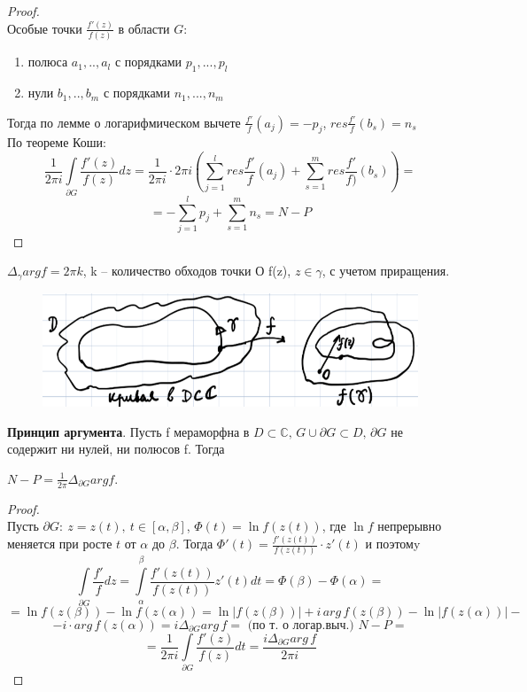 \begin{proof}
    \ \\
    Особые точки $\frac{f'(z)}{f(z)}$ в области $G$:
    \begin{enumerate}
        \item полюса $a_1, .., a_l$ с порядками $p_1, ..., p_l$
        \item нули $b_1, .., b_m$ с порядками $n_1, ..., n_m$
    \end{enumerate}
    Тогда по лемме о логарифмическом вычете $\frac{f'}{f}(a_j)=-p_j$, $res\frac{f'}{f}(b_s)=n_s$\\
    По теореме Коши:
    $$\frac{1}{2\pi i}\int\limits_{\partial G} \frac{f'(z)}{f(z)}dz =\frac{1}{2\pi i}\cdot 2\pi i \left(\sum_{j=1}^l res\frac{f'}{f} (a_j) + \sum_{s=1}^m res \frac{f'}{f)}(b_s)\right) =$$
    $$= - \sum_{j=1}^l p_j +\sum_{s=1}^m n_s = N-P$$
\end{proof}


$\Delta_{\gamma}arg f = 2\pi k$, k -- количество обходов точки О f(z), $z \in \gamma$, с учетом приращения.

\begin{figure}[h]
    \centering
    \includegraphics[width=0.5\linewidth]{answers/img/image1.png}
    \label{fig:enter-label}
\end{figure}

\textbf{Принцип аргумента}. Пусть f мераморфна в $ D \subset \mathbb{C}, \, G \cup \partial G \subset D, \, \partial G$ не содержит ни нулей, ни полюсов f. Тогда 

$N-P = \frac{1}{2 \pi}\Delta_{\partial G}arg f$.

\begin{proof}
    \ \\
    Пусть $\partial G: \ z=z(t), \ t\in[\alpha, \beta]$,
    $\Phi(t)=\ln f(z(t))$, где $\ln f$ непрерывно меняется при росте $t$ от $\alpha$ до $\beta$. Тогда $\Phi'(t)=\frac{f'(z(t))}{f(z(t))}\cdot z'(t)$ и поэтомy
    $$\int\limits_{\partial G}\frac{f'}{f}dz = \int\limits_{\alpha}^{\beta} \frac{f'(z(t))}{f(z(t))}z'(t)dt=\Phi(\beta) - \Phi(\alpha) = $$
    $$= \ln f(z(\beta))-\ln f(z(\alpha)) = \ln |f(z(\beta))| + i \, arg \, f(z(\beta))-\ln |f(z(\alpha))| -$$
    $$ -i\cdot arg\, f(z(\alpha))=i\Delta_{\partial G}arg \, f = \text{ (по т. о логар.выч.) }N-P=$$
    $$=\frac{1}{2\pi i}\int\limits_{\partial G} \frac{f'(z)}{f(z)}dt=\frac{i\Delta_{\partial G}arg\,f}{2\pi i}$$
\end{proof}


